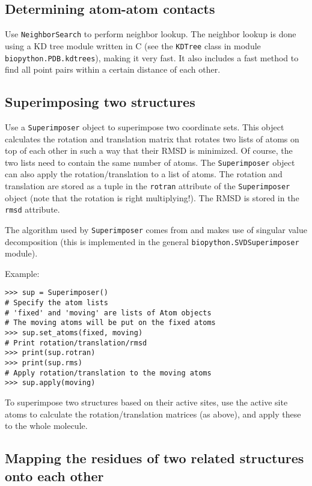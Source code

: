 \subsection{Determining atom-atom contacts}

Use \texttt{NeighborSearch} to perform neighbor lookup.
The neighbor lookup is done using a KD tree module written in C (see the \texttt{KDTree} class in module \texttt{biopython.PDB.kdtrees}), making it very fast.
It also includes a fast method to find all point pairs within a certain distance of each other.

\subsection{Superimposing two structures}

Use a \texttt{Superimposer} object to superimpose two coordinate sets.
This object calculates the rotation and translation matrix that rotates
two lists of atoms on top of each other in such a way that their RMSD
is minimized. Of course, the two lists need to contain the same number
of atoms. The \texttt{Superimposer} object can also apply the rotation/translation
to a list of atoms. The rotation and translation are stored as a tuple
in the \texttt{rotran} attribute of the \texttt{Superimposer} object
(note that the rotation is right multiplying!). The RMSD is stored
in the \texttt{rmsd} attribute.

The algorithm used by \texttt{Superimposer} comes from \cite[Golub \& Van Loan]{golub1989} and makes use of singular value decomposition (this is implemented in the general \texttt{biopython.SVDSuperimposer} module).

Example:

\begin{verbatim}
>>> sup = Superimposer()
# Specify the atom lists
# 'fixed' and 'moving' are lists of Atom objects
# The moving atoms will be put on the fixed atoms
>>> sup.set_atoms(fixed, moving)
# Print rotation/translation/rmsd
>>> print(sup.rotran)
>>> print(sup.rms)
# Apply rotation/translation to the moving atoms
>>> sup.apply(moving)
\end{verbatim}

To superimpose two structures based on their active sites, use the active site atoms to calculate the rotation/translation matrices (as above), and apply these to the whole molecule.

\subsection{Mapping the residues of two related structures onto each other}


